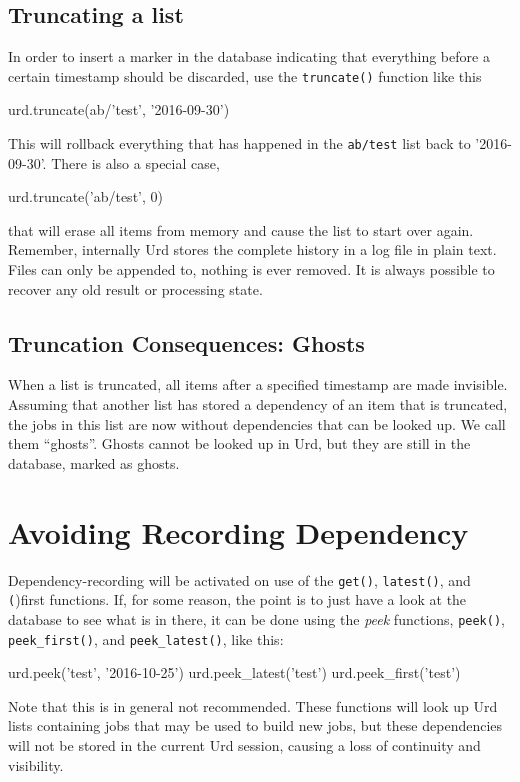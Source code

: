 \subsection{Truncating a list}
In order to insert a marker in the database indicating that everything
before a certain timestamp should be discarded, use
the \texttt{truncate()} function like this
\begin{python}
urd.truncate(ab/'test', '2016-09-30')
\end{python}
This will rollback everything that has happened in
the \texttt{ab/test} list back to '2016-09-30'.  There is also a
special case,
\begin{python}
urd.truncate('ab/test', 0)
\end{python}
that will erase all items from memory and cause the list to start over
again.  Remember, internally Urd stores the complete history in a log
file in plain text.  Files can only be appended to, nothing is ever
removed.  It is always possible to recover any old result or
processing state.


\subsection{Truncation Consequences:  Ghosts}
When a list is truncated, all items after a specified timestamp are
made invisible.  Assuming that another list has stored a dependency of
an item that is truncated, the jobs in this list are now without
dependencies that can be looked up.  We call them ``ghosts''.  Ghosts
cannot be looked up in Urd, but they are still in the database, marked
as ghosts.



\section{Avoiding Recording Dependency}
Dependency-recording will be activated on use of the \texttt{get()},
\texttt{latest()}, and \texttt(){first} functions.  If, for some reason,
the point is to just have a look at the database to see what is in
there, it can be done using the \textsl{peek}
functions, \texttt{peek()}, \texttt{peek\_first()}, and
\texttt{peek\_latest()}, like this:
\begin{python}
urd.peek('test', '2016-10-25')
urd.peek_latest('test')
urd.peek_first('test')
\end{python}
Note that this is in general not recommended.  These functions will
look up Urd lists containing jobs that may be used to build new jobs, but
these dependencies will not be stored in the current Urd session,
causing a loss of continuity and visibility.



